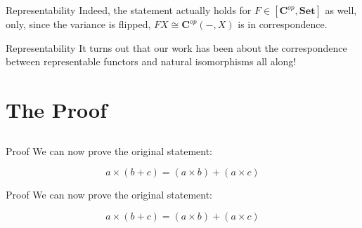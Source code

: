 \documentclass[tikz]{beamer}
\theoremstyle{definition}
\begin{document}
\begin{frame}{Representability}
    Indeed, the statement actually holds for $F \in [\mathbf{C}^{op}, \mathbf{Set}]$ as well, only, since the variance is flipped, $FX \cong \mathbf{C}^{op}(-, X)$ is in correspondence.
\end{frame}{}

\begin{frame}{Representability}
    It turns out that our work has been about the correspondence between representable functors and natural isomorphisms all along!
\end{frame}{}


\section{The Proof}
\subsection{}
    
\begin{frame}{Proof}
    We can now prove the original statement: 
    
    \begin{block}{}
        \begin{equation*}
            a \times (b + c) = (a \times b) + (a \times c)
        \end{equation*}{}
    \end{block}{}
\end{frame}{}

\begin{frame}{Proof}
    We can now prove the original statement: 
    
    \begin{block}{}
        \begin{equation*}
            a \times (b + c) = (a \times b) + (a \times c)
        \end{equation*}{}
    \end{block}{}
\end{frame}{}
\end{document}

